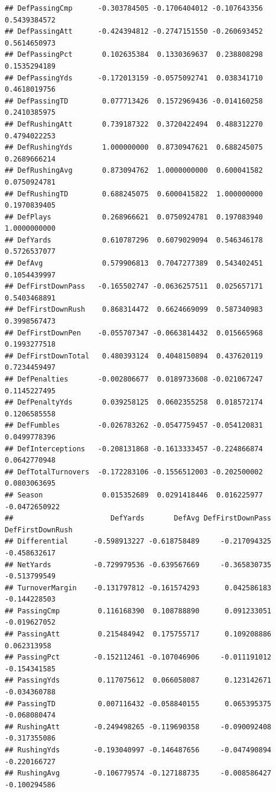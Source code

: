 \documentclass[
]{book}
\begin{document}
\begin{verbatim}
## DefPassingCmp      -0.303784505 -0.1706404012 -0.107643356  0.5439384572
## DefPassingAtt      -0.424394812 -0.2747151550 -0.260693452  0.5614650973
## DefPassingPct       0.102635384  0.1330369637  0.238808298  0.1535294189
## DefPassingYds      -0.172013159 -0.0575092741  0.038341710  0.4618019756
## DefPassingTD        0.077713426  0.1572969436 -0.014160258  0.2410385975
## DefRushingAtt       0.739187322  0.3720422494  0.488312270  0.4794022253
## DefRushingYds       1.000000000  0.8730947621  0.688245075  0.2689666214
## DefRushingAvg       0.873094762  1.0000000000  0.600041582  0.0750924781
## DefRushingTD        0.688245075  0.6000415822  1.000000000  0.1970839405
## DefPlays            0.268966621  0.0750924781  0.197083940  1.0000000000
## DefYards            0.610787296  0.6079029094  0.546346178  0.5726537077
## DefAvg              0.579906813  0.7047277389  0.543402451  0.1054439997
## DefFirstDownPass   -0.165502747 -0.0636257511  0.025657171  0.5403468891
## DefFirstDownRush    0.868314472  0.6624669099  0.587340983  0.3998567473
## DefFirstDownPen    -0.055707347 -0.0663814432  0.015665968  0.1993277518
## DefFirstDownTotal   0.480393124  0.4048150894  0.437620119  0.7234459497
## DefPenalties       -0.002806677  0.0189733608 -0.021067247  0.1145227495
## DefPenaltyYds       0.039258125  0.0602355258  0.018572174  0.1206585558
## DefFumbles         -0.026783262 -0.0547759457 -0.054120831  0.0499778396
## DefInterceptions   -0.208131868 -0.1613333457 -0.224866874  0.0642770948
## DefTotalTurnovers  -0.172283106 -0.1556512003 -0.202500002  0.0803063695
## Season              0.015352689  0.0291418446  0.016225977 -0.0472650922
##                       DefYards       DefAvg DefFirstDownPass DefFirstDownRush
## Differential      -0.598913227 -0.618758489     -0.217094325     -0.458632617
## NetYards          -0.729979536 -0.639567669     -0.365830735     -0.513799549
## TurnoverMargin    -0.131797812 -0.161574293      0.042586183     -0.144228503
## PassingCmp         0.116168390  0.108788890      0.091233051     -0.019627052
## PassingAtt         0.215484942  0.175755717      0.109208886      0.062313958
## PassingPct        -0.152112461 -0.107046906     -0.011191012     -0.154341585
## PassingYds         0.117075612  0.066058087      0.123142671     -0.034360788
## PassingTD          0.007116432 -0.058840155      0.065395375     -0.068080474
## RushingAtt        -0.249498265 -0.119690358     -0.090092408     -0.317355086
## RushingYds        -0.193040997 -0.146487656     -0.047490894     -0.220166727
## RushingAvg        -0.106779574 -0.127188735     -0.008586427     -0.100294586

\end{verbatim}
\end{document}
